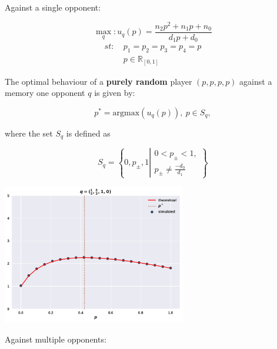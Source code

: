 \documentclass[usenames,dvipsnames,t]{beamer}
\newcommand{\R}{\mathbb{R}}
\begin{document}
\begin{columns}
\begin{column}{.45\linewidth}
        \textcolor{solarizedGreen}{Against a single opponent:}
        \vspace{0.3cm}

        \[ \max_q: u_q(p) = \frac{n_2p^2 + n_1p +n_0 } {d_1p + d_0}\]
        \begin{equation*}
            \begin{aligned}
                st: & \ p_1 = p_2 = p_3 = p_4 = p\\
                & \ p \in \R_{[0, 1]} 
            \end{aligned}
        \end{equation*}
        \vspace{0.3cm}

        \small{
        The optimal behaviour of a \textbf{purely random} player \((p, p, p, p)\)
        against a memory one opponent \(q\) is given by:}
        
        \[p^* = \text{argmax}(u_q(p)), \ p \in S_q,\]
        \vspace{0.3cm}

        \small{
        where the set \(S_q\) is defined as}
        
        \[S_q = \left \{0, p_{\pm}, 1 \left | \begin{array}{l} 0 < p_{\pm} < 1,
            \\ p_{\pm} \neq \frac{-d_0}{d_1} \end{array} \right. \right\}\]
        \vspace{0.5cm}
        
        \begin{center}
            \includegraphics[width=0.6\textwidth]{static/random_vs_one}
        \end{center}
        \vspace{0.5cm}

        \textcolor{solarizedGreen}{Against multiple opponents:}
        \vspace{0.5cm}


\end{column}
\end{columns}
\end{document}
